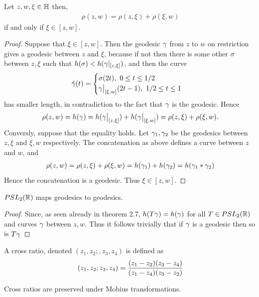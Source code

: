 \begin{corollary}
  Let $z,w,\xi\in \mathbb{H}$ then,
  \begin{align*}
    \rho(z,w) = \rho(z,\xi) + \rho(\xi,w)
  \end{align*}
  if and only if $\xi\in [z,w]$.
\end{corollary}
\begin{proof}
  Suppose that $\xi\in [z,w]$. Then the geodesic $\gamma$ from $z$ to $w$ on restriction gives a geodesic between $z$ and $\xi$, because if not then there is some other $\sigma$ between $z,\xi$ such that $h(\sigma) < h(\gamma|_{[z,\xi]})$, and then the curve
  \begin{align*}
    \tilde{\gamma}(t) = \begin{cases}
      \sigma(2t),\ 0\leq t\leq 1/2\\
      \gamma\big|_{[\xi,w]} (2t-1),\ 1/2\leq t\leq 1  
    \end{cases}
  \end{align*}
  has smaller length, in contradiction to the fact that $\gamma$ is the geodesic. Hence
  \begin{align*}
    \rho(z,w) = h(\gamma) = h(\gamma\big|_{[z,\xi]}) + h(\gamma\big|_{[\xi,w]}) = \rho(z,\xi) + \rho(\xi,w).
  \end{align*}
  Conversly, suppose that the equality holds. Let $\gamma_1,\gamma_2$ be the geodesics between $z,\xi$ and $\xi,w$ respectively. The concatenation as above defines a curve between $z$ and $w$, and
  \begin{align*}
    \rho(z,w) = \rho(z,\xi) + \rho(\xi,w) = h(\gamma_1) + h(\gamma_2) = h(\gamma_1*\gamma_2)
  \end{align*}
  Hence the concatenation is a geodesic. Thus $\xi\in [z,w]$.
\end{proof}
\begin{theorem}
  $PSL_2(\mathbb{R})$ maps geodesics to geodesics.
\end{theorem}
\begin{proof}
  Since, as seen already in theorem 2.7, $h(T\gamma) = h(\gamma)$ for all $T\in PSL_2(\mathbb{R})$ and curves $\gamma$ between $z,w$. Thus it follows trivially that if $\gamma$ is a geodesic then so is $T\gamma$ 
\end{proof}
\begin{definition}
  A cross ratio, denoted $(z_1,z_2;,z_3,z_4)$ is defined as
  \begin{align*}
    (z_1,z_2;z_3,z_4) = \frac{(z_1 - z_2)(z_3-z_4)}{(z_1-z_4)(z_3-z_2)}
  \end{align*}
\end{definition}
\begin{proposition}
  Cross ratios are preserved under Mobius transformations.
\end{proposition}
